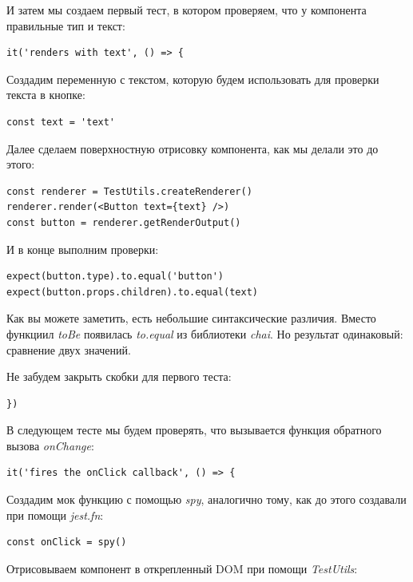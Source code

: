 И затем мы создаем первый тест, в котором проверяем, что у компонента правильные тип и текст:

\begin{lstlisting}
it('renders with text', () => {
\end{lstlisting}

Создадим переменную с текстом, которую будем использовать для проверки текста в кнопке:

\begin{lstlisting}
const text = 'text'
\end{lstlisting}

Далее сделаем поверхностную отрисовку компонента, как мы делали это до этого:

\begin{lstlisting}
const renderer = TestUtils.createRenderer()
renderer.render(<Button text={text} />)
const button = renderer.getRenderOutput()
\end{lstlisting}

И в конце выполним проверки:

\begin{lstlisting}
expect(button.type).to.equal('button')
expect(button.props.children).to.equal(text)
\end{lstlisting}

Как вы можете заметить, есть небольшие синтаксические различия. Вместо функциил \textit{toBe} появилась \textit{to.equal} из библиотеки \textit{chai}. Но результат одинаковый: сравнение двух значений.

Не забудем закрыть скобки для первого теста:

\begin{lstlisting}
})
\end{lstlisting}

В следующем тесте мы будем проверять, что вызывается функция обратного вызова \textit{onChange}:

\begin{lstlisting}
it('fires the onClick callback', () => {
\end{lstlisting}

Создадим мок функцию с помощью \textit{spy}, аналогично тому, как до этого создавали при помощи \textit{jest.fn}:

\begin{lstlisting}
const onClick = spy()
\end{lstlisting}

Отрисовываем компонент в открепленный DOM при помощи \textit{TestUtils}:

